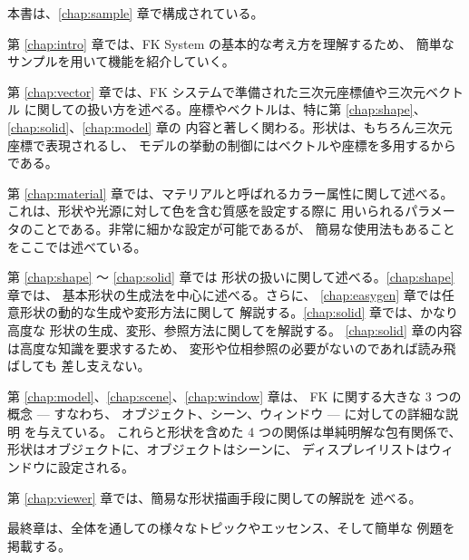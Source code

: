 本書は、\ref{chap:sample} 章で構成されている。

第 \ref{chap:intro} 章では、FK System の基本的な考え方を理解するため、
簡単なサンプルを用いて機能を紹介していく。

第 \ref{chap:vector} 章では、FK システムで準備された三次元座標値や三次元ベクトル
に関しての扱い方を述べる。座標やベクトルは、特に第 \ref{chap:shape}、
\ref{chap:solid}、\ref{chap:model} 章の
内容と著しく関わる。形状は、もちろん三次元座標で表現されるし、
モデルの挙動の制御にはベクトルや座標を多用するからである。

第 \ref{chap:material} 章では、マテリアルと呼ばれるカラー属性に関して述べる。
これは、形状や光源に対して色を含む質感を設定する際に
用いられるパラメータのことである。非常に細かな設定が可能であるが、
簡易な使用法もあることをここでは述べている。

第 \ref{chap:shape} 〜 \ref{chap:solid} 章では
形状の扱いに関して述べる。\ref{chap:shape} 章では、
基本形状の生成法を中心に述べる。さらに、
\ref{chap:easygen} 章では任意形状の動的な生成や変形方法に関して
解説する。\ref{chap:solid} 章では、かなり高度な
形状の生成、変形、参照方法に関してを解説する。
\ref{chap:solid} 章の内容は高度な知識を要求するため、
変形や位相参照の必要がないのであれば読み飛ばしても
差し支えない。

第 \ref{chap:model}、\ref{chap:scene}、\ref{chap:window} 章は、
FK に関する大きな 3 つの概念 --- すなわち、
オブジェクト、シーン、ウィンドウ --- に対しての詳細な説明
を与えている。
これらと形状を含めた 4 つの関係は単純明解な包有関係で、
形状はオブジェクトに、オブジェクトはシーンに、
ディスプレイリストはウィンドウに設定される。

第 \ref{chap:viewer} 章では、簡易な形状描画手段に関しての解説を
述べる。

最終章は、全体を通しての様々なトピックやエッセンス、そして簡単な
例題を掲載する。
